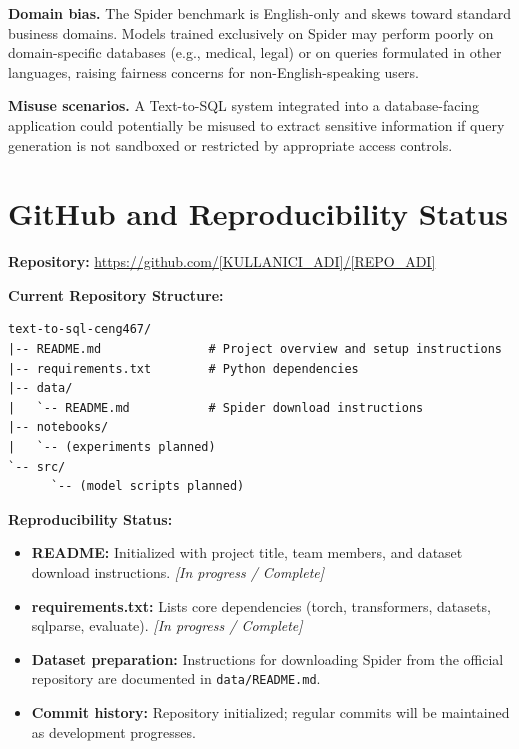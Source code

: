\documentclass[11pt,a4paper]{article}
\begin{document}
\noindent\textbf{Domain bias.}
The Spider benchmark is English-only and skews toward standard business domains.
Models trained exclusively on Spider may perform poorly on domain-specific
databases (e.g., medical, legal) or on queries formulated in other languages,
raising fairness concerns for non-English-speaking users.

\noindent\textbf{Misuse scenarios.}
A Text-to-SQL system integrated into a database-facing application could
potentially be misused to extract sensitive information if query generation
is not sandboxed or restricted by appropriate access controls.


\section{GitHub and Reproducibility Status}


\noindent\textbf{Repository:}
\url{https://github.com/[KULLANICI_ADI]/[REPO_ADI]}

\noindent\textbf{Current Repository Structure:}
\begin{lstlisting}
text-to-sql-ceng467/
|-- README.md               # Project overview and setup instructions
|-- requirements.txt        # Python dependencies
|-- data/
|   `-- README.md           # Spider download instructions
|-- notebooks/
|   `-- (experiments planned)
`-- src/
      `-- (model scripts planned)
\end{lstlisting}

\noindent\textbf{Reproducibility Status:}
\begin{itemize}[noitemsep]
  \item \textbf{README:} Initialized with project title, team members, and
        dataset download instructions. \textit{[In progress / Complete]}
  \item \textbf{requirements.txt:} Lists core dependencies (torch, transformers,
        datasets, sqlparse, evaluate). \textit{[In progress / Complete]}
  \item \textbf{Dataset preparation:} Instructions for downloading Spider from
        the official repository are documented in \texttt{data/README.md}.
  \item \textbf{Commit history:} Repository initialized;
        regular commits will be maintained as development progresses.
\end{itemize}
\end{document}
